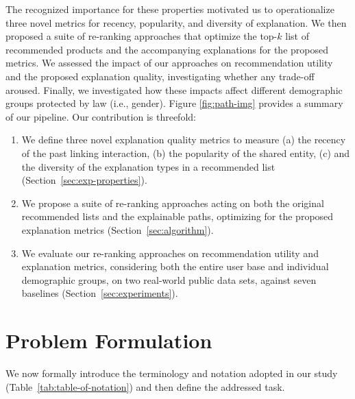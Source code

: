 \documentclass[sigconf]{acmart}
\begin{document}
The recognized importance for these properties motivated us to operationalize three novel metrics for recency, popularity, and diversity of explanation. 
We then proposed a suite of re-ranking approaches that optimize the top-$k$ list of recommended products and the accompanying explanations for the proposed metrics.
We assessed the impact of our approaches on recommendation utility and the proposed explanation quality, investigating whether any trade-off aroused. 
Finally, we investigated how these impacts affect different demographic groups protected by law (i.e., gender). Figure \ref{fig:path-img} provides a summary of our pipeline. 
Our contribution is threefold:
\begin{enumerate}

\item We define three novel explanation quality metrics to measure (a) the recency of the past linking interaction, (b) the popularity of the shared entity, (c) and the diversity of the explanation types in a recommended list (Section~\ref{sec:exp-properties}).

\item We propose a suite of re-ranking approaches acting on both the original recommended lists and the explainable paths, optimizing for the proposed explanation metrics (Section~\ref{sec:algorithm}). 

\item We evaluate our re-ranking approaches on recommendation utility and explanation metrics, considering both the entire user base and individual demographic groups, on two real-world public data sets, against seven baselines (Section~\ref{sec:experiments}).
\end{enumerate}

\section{Problem Formulation}\label{sec:preliminaries}
We now formally introduce the terminology and notation adopted in our study (Table~\ref{tab:table-of-notation}) and then define the addressed task. 
\end{document}
